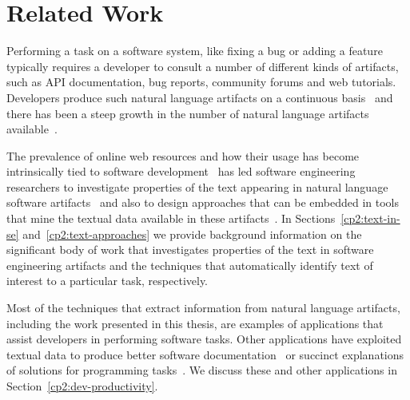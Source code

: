 \setcounter{chapter}{1}


\chapter{Related Work}
\label{ch:related-work}








Performing a task on a software system, like fixing a bug
or adding a feature typically requires a developer to consult
a number of different kinds of artifacts, such
as API documentation, bug reports, community forums
and web tutorials. 
Developers produce such natural language artifacts on a 
continuous basis~\cite{Rastkar2013t} 
and there has been a steep growth in the number 
of natural language artifacts available~\cite{Bavota2016, aa}.


The prevalence of online web resources and how their usage has become intrinsically tied to software development~\cite{} has led 
 software engineering researchers to 
investigate 
properties of the text 
appearing in natural language software artifacts~\cite{aa}
and also to design approaches that 
can be embedded in
tools that mine the textual data available in these artifacts~\cite{aa}.
In Sections~\ref{cp2:text-in-se} and~\ref{cp2:text-approaches}
we  provide background information on the significant body 
of work that investigates properties of the text in software engineering 
artifacts and the techniques that automatically identify text of interest 
to a particular task, respectively.







Most of the techniques that extract information from natural 
language artifacts, including the work presented in this thesis, 
are examples of applications that assist developers in performing 
software tasks. 
Other applications have exploited textual data
to produce better software documentation~\cite{Treude2016, mcburney2014, robillard2017} 
or  succinct  explanations of solutions for programming tasks~\cite{silva2019}.
We discuss these and other applications in Section~\ref{cp2:dev-productivity}.









